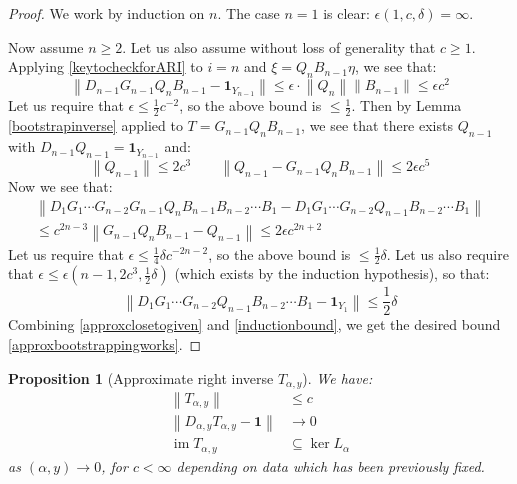 \documentclass[12pt]{article}
\newtheorem{proposition}[theorem]{Proposition}
\theoremstyle{definition}
\theoremstyle{remark}
\numberwithin{equation}{subsection}
\newcommand{\im}{\operatorname{im}}
\begin{document}
\begin{proof}
We work by induction on $n$.  The case $n=1$ is clear: $\epsilon(1,c,\delta)=\infty$.

Now assume $n\geq 2$.  Let us also assume without loss of generality that $c\geq 1$.  Applying \eqref{keytocheckforARI} to $i=n$ and $\xi=Q_nB_{n-1}\eta$, we see that:
\begin{equation}
\left\|D_{n-1}G_{n-1}Q_nB_{n-1}-\mathbf 1_{Y_{n-1}}\right\|\leq\epsilon\cdot\left\|Q_n\right\|\left\|B_{n-1}\right\|\leq\epsilon c^2
\end{equation}
Let us require that $\epsilon\leq\frac 12c^{-2}$, so the above bound is $\leq\frac 12$.  Then by Lemma \ref{bootstrapinverse} applied to $T=G_{n-1}Q_nB_{n-1}$, we see that there exists $Q_{n-1}$ with $D_{n-1}Q_{n-1}=\mathbf 1_{Y_{n-1}}$ and:
\begin{equation}
\left\|Q_{n-1}\right\|\leq 2c^3\qquad\left\|Q_{n-1}-G_{n-1}Q_nB_{n-1}\right\|\leq 2\epsilon c^5
\end{equation}
Now we see that:
\begin{multline}\label{approxclosetogiven}
\left\|D_1G_1\cdots G_{n-2}G_{n-1}Q_nB_{n-1}B_{n-2}\cdots B_1-D_1G_1\cdots G_{n-2}Q_{n-1}B_{n-2}\cdots B_1\right\|\\
\leq c^{2n-3}\left\|G_{n-1}Q_nB_{n-1}-Q_{n-1}\right\|\leq 2\epsilon c^{2n+2}
\end{multline}
Let us require that $\epsilon\leq\frac 14\delta c^{-2n-2}$, so the above bound is $\leq\frac 12\delta$.  Let us also require that $\epsilon\leq\epsilon(n-1,2c^3,\frac 12\delta)$ (which exists by the induction hypothesis), so that:
\begin{equation}\label{inductionbound}
\left\|D_1G_1\cdots G_{n-2}Q_{n-1}B_{n-2}\cdots B_1-\mathbf 1_{Y_1}\right\|\leq\frac 12\delta
\end{equation}
Combining \eqref{approxclosetogiven} and \eqref{inductionbound}, we get the desired bound \eqref{approxbootstrappingworks}.
\end{proof}

\begin{proposition}[Approximate right inverse $T_{\alpha,y}$]\label{approxworks}
We have:
\begin{align}
\left\|T_{\alpha,y}\right\|&\leq c\\
\label{Tapproxeqn}\left\|D_{\alpha,y} T_{\alpha,y}-\mathbf 1\right\|&\to 0\\
\im T_{\alpha,y}&\subseteq\ker L_\alpha
\end{align}
as $(\alpha,y)\to 0$, for $c<\infty$ depending on data which has been previously fixed.
\end{proposition}
\end{document}
